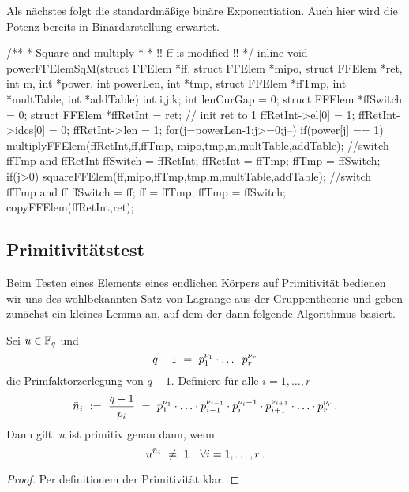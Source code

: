 Als nächstes folgt die standardmäßige binäre Exponentiation. Auch hier wird die
Potenz bereits in Binärdarstellung erwartet.

\begin{ccode}[caption={Aus \url{../Sage/enumeratePCNs.c}},
  firstnumber=602, label=lst:powerffelemsqm]
/**
 * Square and multiply
 *
 * !! ff is modified !!
 */
inline void powerFFElemSqM(struct FFElem *ff, struct FFElem *mipo,
        struct FFElem *ret, 
        int m, int *power, int powerLen,
        int *tmp, struct FFElem *ffTmp,
        int *multTable, int *addTable){
    int i,j,k;
    int lenCurGap = 0;
    struct FFElem *ffSwitch = 0;
    struct FFElem *ffRetInt = ret;
    // init ret to 1
    ffRetInt->el[0] = 1; ffRetInt->idcs[0] = 0; ffRetInt->len = 1;
    for(j=powerLen-1;j>=0;j--){
        if(power[j] == 1){
            multiplyFFElem(ffRetInt,ff,ffTmp, mipo,tmp,m,multTable,addTable);
            //switch ffTmp and ffRetInt
            ffSwitch = ffRetInt; ffRetInt = ffTmp; ffTmp = ffSwitch;
        }
        if(j>0){
            squareFFElem(ff,mipo,ffTmp,tmp,m,multTable,addTable);
            //switch ffTmp and ff
            ffSwitch = ff; ff = ffTmp; ffTmp = ffSwitch;
        }
    }
    copyFFElem(ffRetInt,ret);
}
\end{ccode}


\subsection{Primitivitätstest}
\label{subsub:primitivitaetstest}

Beim Testen eines Elements eines endlichen Körpers auf Primitivität bedienen
wir uns des wohlbekannten Satz von Lagrange aus der Gruppentheorie und geben
zunächst ein kleines Lemma an, auf dem der dann folgende Algorithmus basiert.

\begin{lemma}
  Sei $u \in \mathbb{F}_q$ und
  \[ q-1 \ =\  p_1^{\nu_1}\cdot\ldots\cdot p_r^{\nu_r}\]
  die Primfaktorzerlegung von $q-1$. Definiere
  für alle $i=1,\dots,r$
  \[ \bar n_i \ :=\   \frac{q-1}{p_i} \ =\ 
    p_1^{\nu_1}\cdot \ldots\cdot p_{i-1}^{\nu_{i-1}} \cdot
    p_i^{\nu_i-1}\cdot p_{i+1}^{\nu_{i+1}}\cdot\ldots\cdot p_r^{\nu_r}\,.\]
  Dann gilt: $u$ ist primitiv genau dann, wenn
  \[ u^{\bar n_i} \ \neq\  1\quad\forall i=1,\ldots,r \,.\]
\end{lemma}
\begin{proof}
  Per definitionem der Primitivität klar.
\end{proof}

